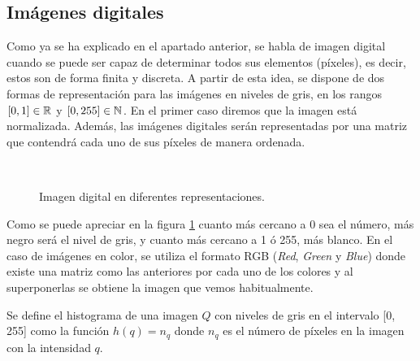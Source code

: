 \subsection{Imágenes digitales}\label{sec:imagenesdigitales}
Como ya se ha explicado en el apartado anterior, se habla de imagen digital cuando se puede ser capaz de determinar todos sus elementos (píxeles), es decir, estos son de forma finita y discreta. A partir de esta idea, se dispone de dos formas de representación para las imágenes en niveles de gris, en los rangos $[0,1]\in\mathbb{R}$ y $[0,255]\in\mathbb{N}$. En el primer caso diremos que la imagen está normalizada. Además, las imágenes digitales serán representadas por una matriz que contendrá cada uno de sus píxeles de manera ordenada.


\begin{figure}
\centering
    \quad
    \quad\ 
    \caption{Imagen digital en diferentes representaciones.}
    \label{fig:defimagen}
\end{figure}

Como se puede apreciar en la figura \ref{fig:defimagen} cuanto más cercano a 0 sea el número, más negro será el nivel de gris, y cuanto más cercano a 1 ó 255, más blanco. En el caso de imágenes en color, se utiliza el formato RGB ({\em Red}, {\em Green} y {\em Blue}) donde existe una matriz como las anteriores por cada uno de los colores y al superponerlas se obtiene la imagen que vemos habitualmente.

\begin{definition}\label{def:histograma}
Se define el histograma de una imagen $Q$ con niveles de gris en el intervalo [0, 255] como la función $h(q) = n_q$ donde $n_q$ es el número de píxeles en la imagen con la intensidad $q$.
\end{definition}

